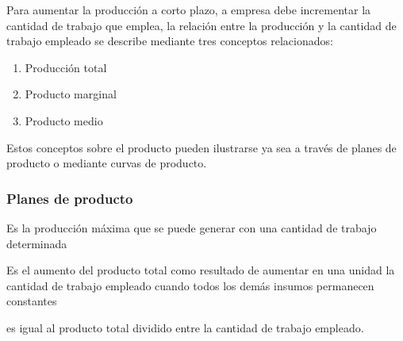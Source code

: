 Para aumentar la producción a corto plazo, a empresa debe incrementar la cantidad de trabajo que emplea, la relación entre la producción y la cantidad de trabajo empleado se describe mediante tres conceptos relacionados:
\begin{enumerate}
    \item Producción total
    \item Producto marginal
    \item Producto medio
\end{enumerate}
Estos conceptos sobre el producto pueden ilustrarse ya sea a través de planes de producto o mediante curvas de producto.

\subsubsection{Planes de producto}
\begin{definition}
    Es la producción máxima que se puede generar con una cantidad de trabajo determinada
\end{definition}

\begin{definition}
    Es el aumento del producto total como resultado de aumentar en una unidad la cantidad de trabajo empleado cuando todos los demás insumos permanecen constantes
\end{definition}

\begin{definition}
    es igual al producto total dividido entre la cantidad de trabajo empleado.
\end{definition}





































